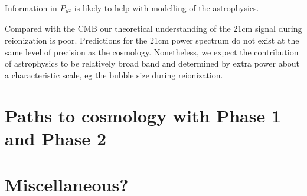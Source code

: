 \documentclass{PoS}
\begin{document}
Information in $P_{\mu^2}$ is likely to help with modelling of the astrophysics. 

Compared with the CMB our theoretical understanding of the 21cm signal during reionization is poor. Predictions for the 21cm power spectrum do not exist at the same level of precision as the cosmology. Nonetheless, we expect the contribution of astrophysics to be relatively broad band and determined by extra power about a characteristic scale, eg the bubble size during reionization.

\section{Paths to cosmology with Phase 1 and Phase 2}

\section{Miscellaneous?}





{}

\end{document}
